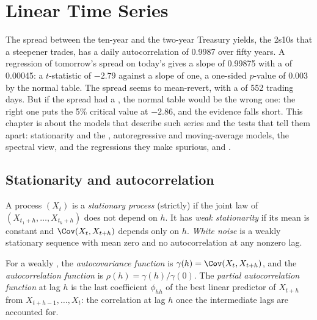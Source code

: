 \chapter{Linear Time Series}\label{ch:qm:linear-time-series}

The spread between the ten-year and the two-year Treasury yields, the 2s10s that a steepener trades, has a daily autocorrelation of
0.9987 over fifty years. A regression of tomorrow's spread on today's gives a slope of 0.99875 with a  of 0.00045: a
$t$-statistic of $-2.79$ against a slope of one, a one-sided $p$-value of 0.003 by the normal table. The spread seems to mean-revert,
with a  of 552 trading days. But if the spread had a , the normal table would be the wrong one: the right one puts the
5\% critical value at $-2.86$, and the evidence falls short. This chapter is about the models that describe such series and the tests that
tell them apart: stationarity and the , autoregressive and moving-average models, the spectral view, 
and the regressions they make spurious, and .

\section{Stationarity and autocorrelation}

\begin{definition}\label{def:qm:linear-time-series:stationary}
A process $(X_t)$ is a \emph{stationary process} (strictly) if the joint law of $(X_{t_1 + h}, \dots, X_{t_k + h})$ does not
depend on $h$. It has \emph{weak stationarity} if its mean is constant and $\Cov(X_t, X_{t+h})$ depends only on $h$.
\emph{White noise} is a weakly stationary sequence with mean zero and no autocorrelation at any nonzero lag.
\end{definition}

\begin{definition}\label{def:qm:linear-time-series:acf}
For a weakly , the \emph{autocovariance function} is $\gamma(h) = \Cov(X_t, X_{t+h})$, and the
\emph{autocorrelation function} is $\rho(h) = \gamma(h)/\gamma(0)$. The \emph{partial autocorrelation
function} at lag $h$ is the last coefficient $\phi_{hh}$ of the best linear predictor of $X_{t+h}$ from $X_{t+h-1},
\dots, X_t$: the correlation at lag $h$ once the intermediate lags are accounted for.
\end{definition}

